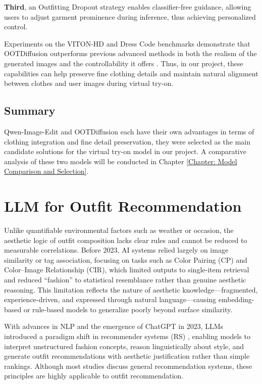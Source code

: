 \textbf{Third}, an Outfitting Dropout strategy enables classifier-free guidance, allowing users to adjust garment prominence during inference, thus achieving personalized control.

Experiments on the VITON-HD and Dress Code benchmarks demonstrate that OOTDiffusion outperforms previous advanced methods in both the realism of the generated images and the controllability it offers \citep{xu2025ootddiffusion}. Thus, in our project, these capabilities can help preserve fine clothing details and maintain natural alignment between clothes and user images during virtual try-on.


\subsection{Summary}

 Qwen-Image-Edit and OOTDiffusion each have their own advantages in terms of clothing integration and fine detail preservation, they were selected as the main candidate solutions for the virtual try-on model in our project. A comparative analysis of these two models will be conducted in Chapter \ref{Chapter: Model Comparison and Selection}. 





\section{LLM for Outfit Recommendation}
Unlike quantifiable environmental factors such as weather or occasion, the aesthetic logic of outfit composition lacks clear rules and cannot be reduced to measurable correlations. Before 2023, AI systems relied largely on image similarity or tag association, focusing on tasks such as Color Pairing (CP) and Color–Image Relationship (CIR), which limited outputs to single-item retrieval and reduced “fashion” to statistical resemblance rather than genuine aesthetic reasoning. This limitation reflects the nature of aesthetic knowledge—fragmented, experience-driven, and expressed through natural language—causing embedding-based or rule-based models to generalize poorly beyond surface similarity.

With advances in NLP and the emergence of ChatGPT in 2023, LLMs introduced a paradigm shift in recommender systems (RS) \citep{wu2023survey, lin2023benefit}, enabling models to interpret unstructured fashion concepts, reason linguistically about style, and generate outfit recommendations with aesthetic justification rather than simple rankings. Although most studies discuss general recommendation systems, these principles are highly applicable to outfit recommendation.


